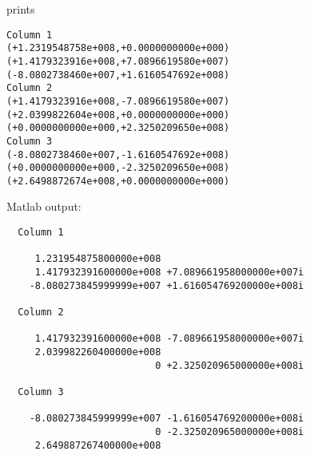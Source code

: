 prints
\begin{Verbatim}
Column 1
(+1.2319548758e+008,+0.0000000000e+000)
(+1.4179323916e+008,+7.0896619580e+007)
(-8.0802738460e+007,+1.6160547692e+008)
Column 2
(+1.4179323916e+008,-7.0896619580e+007)
(+2.0399822604e+008,+0.0000000000e+000)
(+0.0000000000e+000,+2.3250209650e+008)
Column 3
(-8.0802738460e+007,-1.6160547692e+008)
(+0.0000000000e+000,-2.3250209650e+008)
(+2.6498872674e+008,+0.0000000000e+000)
\end{Verbatim}
Matlab output:
\begin{Verbatim}
  Column 1 

     1.231954875800000e+008                         
     1.417932391600000e+008 +7.089661958000000e+007i
    -8.080273845999999e+007 +1.616054769200000e+008i

  Column 2 

     1.417932391600000e+008 -7.089661958000000e+007i
     2.039982260400000e+008                         
                          0 +2.325020965000000e+008i

  Column 3 

    -8.080273845999999e+007 -1.616054769200000e+008i
                          0 -2.325020965000000e+008i
     2.649887267400000e+008                         
\end{Verbatim}
\newpage




